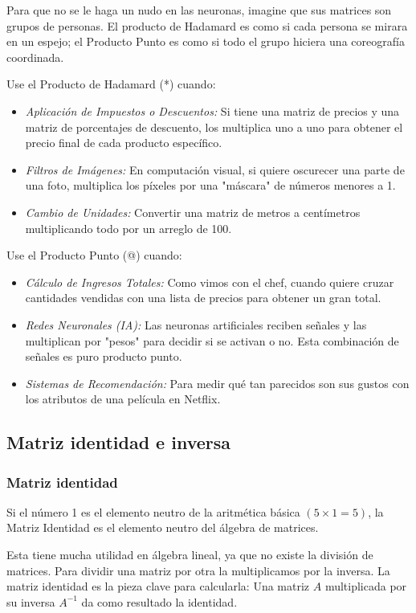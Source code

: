 Para que no se le haga un nudo en las neuronas, imagine que sus matrices son grupos de personas. El producto de Hadamard es como si cada persona se mirara en un espejo; el Producto Punto es como si todo el grupo hiciera una coreografía coordinada.

Use el Producto de Hadamard (*) cuando:
\begin{itemize}
\item \textit{Aplicación de Impuestos o Descuentos:} Si tiene una matriz de precios y una matriz de porcentajes de descuento, los multiplica uno a uno para obtener el precio final de cada producto específico.
\item \textit{Filtros de Imágenes:} En computación visual, si quiere oscurecer una parte de una foto, multiplica los píxeles por una "máscara" de números menores a 1.
\item \textit{Cambio de Unidades:} Convertir una matriz de metros a centímetros multiplicando todo por un arreglo de 100.
\end{itemize}

Use el Producto Punto (@) cuando:
\begin{itemize}
\item \textit{Cálculo de Ingresos Totales:} Como vimos con el chef, cuando quiere cruzar cantidades vendidas con una lista de precios para obtener un gran total.
\item \textit{Redes Neuronales (IA):} Las neuronas artificiales reciben señales y las multiplican por "pesos" para decidir si se activan o no. Esta combinación de señales es puro producto punto.
\item \textit{Sistemas de Recomendación:} Para medir qué tan parecidos son sus gustos con los atributos de una película en Netflix.
\end{itemize}




\subsection{Matriz identidad e inversa}

\subsubsection{Matriz identidad}

Si el número 1 es el elemento neutro de la aritmética básica \((5\times1=5)\), la Matriz Identidad es el elemento neutro del álgebra de matrices.

Esta tiene mucha utilidad en álgebra lineal, ya que no existe la división de matrices. Para dividir una matriz por otra la multiplicamos por la inversa. La matriz identidad es la pieza clave para calcularla: Una matriz \(A\) multiplicada por su inversa \(A^{-1}\) da como resultado la identidad.

